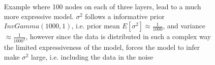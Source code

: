 \begin{figure}[H]
\begin{minipage}[b]{0.49\textwidth}
     \end{minipage}
     \caption{Example where 100 nodes on each of three layers, lead to a much more expressive model.
     $\sigma^2$ follows a informative prior $InvGamma(1000,1)$, i.e. prior mean $E[\sigma^2] \approx
     \frac{1}{1000}$, and variance $\approx \frac{1}{1000^3}$, however since the data is distributed in such 
     a complex way the limited expressiveness of the model, forces the model to infer make $\sigma^2$ large, 
     i.e. including the data in the noise}
\end{figure}




